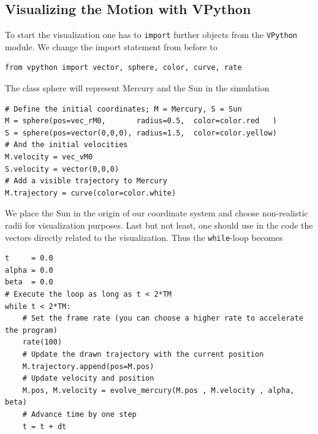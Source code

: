 \documentclass[12pt,ngerman,american]{iopart}
\begin{document}
\subsection{Visualizing the Motion with VPython}
To start the visualization one has to \texttt{import} further objects from the \texttt{VPython} module.
We change the import statement from before to
\begin{lstlisting}
from vpython import vector, sphere, color, curve, rate
\end{lstlisting}
The class sphere will represent Mercury and the Sun in the simulation
\begin{lstlisting}
# Define the initial coordinates; M = Mercury, S = Sun
M = sphere(pos=vec_rM0,       radius=0.5,  color=color.red   )
S = sphere(pos=vector(0,0,0), radius=1.5,  color=color.yellow)
# And the initial velocities
M.velocity = vec_vM0
S.velocity = vector(0,0,0)
# Add a visible trajectory to Mercury
M.trajectory = curve(color=color.white)
\end{lstlisting}
We place the Sun in the origin of our coordinate system and choose non-realistic radii for visualization purposes.
Last but not least, one should use in the code the vectors directly related to the visualization. Thus
the \texttt{while}-loop becomes
\begin{lstlisting}
t     = 0.0
alpha = 0.0
beta  = 0.0
# Execute the loop as long as t < 2*TM
while t < 2*TM:
    # Set the frame rate (you can choose a higher rate to accelerate the program)
    rate(100)
    # Update the drawn trajectory with the current position
    M.trajectory.append(pos=M.pos)
    # Update velocity and position
    M.pos, M.velocity = evolve_mercury(M.pos , M.velocity , alpha, beta)
    # Advance time by one step
    t = t + dt
\end{lstlisting}
\end{document}
